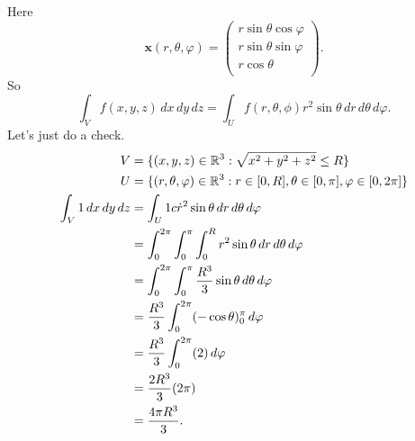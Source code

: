 \begin{example}
    Here
    \[
        \bm x(r,\theta,\varphi)=
        \begin{pmatrix}
            r\sin\theta\cos\varphi \\
            r\sin\theta\sin\varphi \\
            r\cos\theta \\
        \end{pmatrix}.
    \]
    So
    \[
        \int_V f(x,y,z) \,dx\,dy\,dz
        = \int_U f(r,\theta,\phi) r^2\sin\theta \,dr\,d\theta\,d\varphi.
    \]
    Let's just do a check.
    \begin{align*}
        V &= \{(x,y,z) \in \mathbb{R}^3: \sqrt{x^2 + y^2 + z^2} \leq R\} \\
        U &= \{
                (r,\theta,\varphi) \in \mathbb{R}^3: r \in [0,R],
                                             \theta \in [0,\pi],
                                             \varphi \in [0,2\pi]
             \} \\
        \int_V 1 \,dx\,dy\,dz
        &= \int_U 1 c\dot r^2\sin\theta \,dr\,d\theta\,d\varphi \\
        &= \int_0^{2\pi} \int_0^\pi \int_0^R
            r^2 \sin\theta \,dr\,d\theta\,d\varphi \\
        &= \int_0^{2\pi} \int_0^\pi \frac{R^3}{3} \sin\theta
            \,d\theta\,d\varphi \\
        &= \frac{R^3}{3} \int_0^{2\pi} (-\cos\theta)^\pi_0 \,d\varphi \\
        &= \frac{R^3}{3} \int_0^{2\pi} (2) \,d\varphi \\
        &= \frac{2R^3}{3} (2\pi) \\
        &= \frac{4\pi R^3}{3}.
    \end{align*}
\end{example}

